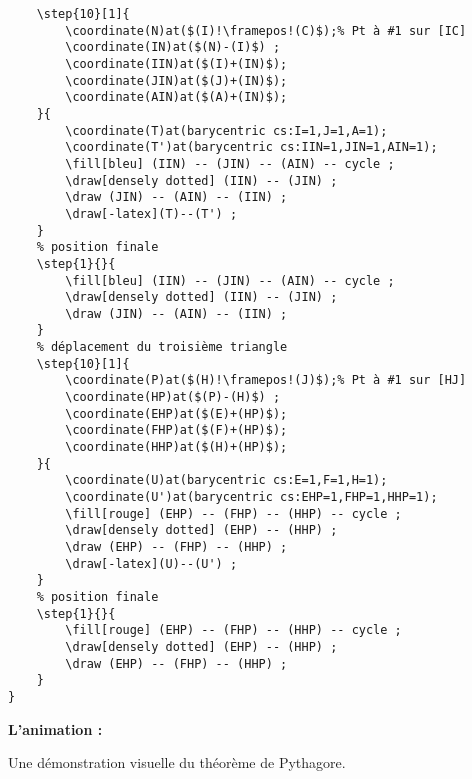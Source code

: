 \documentclass[a4paper,12pt]{article}
\begin{document}
\begin{lstlisting}[name=exemplecomplet]
	% déplacement du deuxième triangle
	\step{10}[1]{
		\coordinate(N)at($(I)!\framepos!(C)$);% Pt à #1 sur [IC]
		\coordinate(IN)at($(N)-(I)$) ;
		\coordinate(IIN)at($(I)+(IN)$);
		\coordinate(JIN)at($(J)+(IN)$);
		\coordinate(AIN)at($(A)+(IN)$);
	}{
		\coordinate(T)at(barycentric cs:I=1,J=1,A=1);
		\coordinate(T')at(barycentric cs:IIN=1,JIN=1,AIN=1);
		\fill[bleu] (IIN) -- (JIN) -- (AIN) -- cycle ;
		\draw[densely dotted] (IIN) -- (JIN) ;
		\draw (JIN) -- (AIN) -- (IIN) ;
		\draw[-latex](T)--(T') ;
	}
	% position finale
	\step{1}{}{
		\fill[bleu] (IIN) -- (JIN) -- (AIN) -- cycle ;
		\draw[densely dotted] (IIN) -- (JIN) ;
		\draw (JIN) -- (AIN) -- (IIN) ;
	}
	% déplacement du troisième triangle
	\step{10}[1]{
		\coordinate(P)at($(H)!\framepos!(J)$);% Pt à #1 sur [HJ]
		\coordinate(HP)at($(P)-(H)$) ;
		\coordinate(EHP)at($(E)+(HP)$);
		\coordinate(FHP)at($(F)+(HP)$);
		\coordinate(HHP)at($(H)+(HP)$);
	}{
		\coordinate(U)at(barycentric cs:E=1,F=1,H=1);
		\coordinate(U')at(barycentric cs:EHP=1,FHP=1,HHP=1);
		\fill[rouge] (EHP) -- (FHP) -- (HHP) -- cycle ;
		\draw[densely dotted] (EHP) -- (HHP) ;
		\draw (EHP) -- (FHP) -- (HHP) ;
		\draw[-latex](U)--(U') ;
	}
	% position finale
	\step{1}{}{
		\fill[rouge] (EHP) -- (FHP) -- (HHP) -- cycle ;
		\draw[densely dotted] (EHP) -- (HHP) ;
		\draw (EHP) -- (FHP) -- (HHP) ;
	}
}
\end{lstlisting}

\textbf{L'animation :}

Une démonstration visuelle du théorème de Pythagore.
\end{document}
